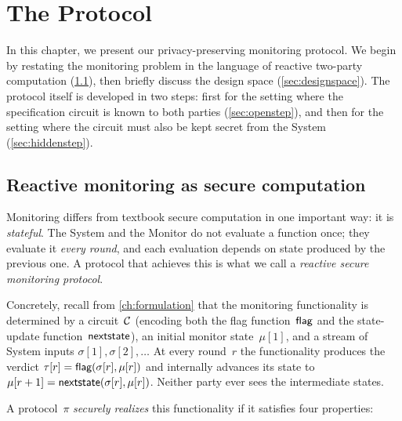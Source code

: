 \chapter{The Protocol}\label{ch:protocol}

In this chapter, we present our privacy-preserving monitoring protocol. We begin by restating the monitoring problem in the language of reactive two-party computation (\cref{sec:framework}), then briefly discuss the design space (\cref{sec:designspace}). The protocol itself is developed in two steps: first for the setting where the specification circuit is known to both parties (\cref{sec:openstep}), and then for the setting where the circuit must also be kept secret from the System (\cref{sec:hiddenstep}).

\section{Reactive monitoring as secure computation}\label{sec:framework}

Monitoring differs from textbook secure computation in one important way: it is \emph{stateful}. The System and the Monitor do not evaluate a function once; they evaluate it \emph{every round}, and each evaluation depends on state produced by the previous one. A protocol that achieves this is what we call a \emph{reactive secure monitoring protocol}.

Concretely, recall from \cref{ch:formulation} that the monitoring functionality is determined by a circuit~$\mathcal{C}$ (encoding both the flag function~$\textsf{flag}$ and the state-update function~$\textsf{nextstate}$), an initial monitor state~$\mu[1]$, and a stream of System inputs $\sigma[1],\sigma[2],\ldots$ At every round~$r$ the functionality produces the verdict $\tau[r] = \textsf{flag}(\sigma[r],\mu[r])$ and internally advances its state to $\mu[r+1] = \textsf{nextstate}(\sigma[r],\mu[r])$. Neither party ever sees the intermediate states.

A protocol~$\pi$ \emph{securely realizes} this functionality if it satisfies four properties:

